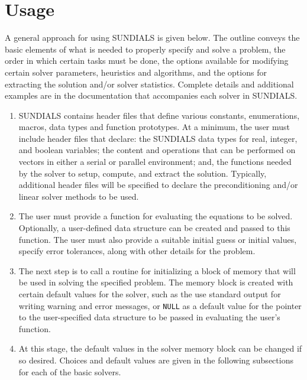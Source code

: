 \section{Usage}

A general approach for using SUNDIALS is given below. 
The outline conveys the basic elements of what is needed to properly
specify and solve a problem, the order in which certain tasks must be
done, the options available for modifying certain solver parameters,
heuristics and algorithms, and the options for extracting the solution
and/or solver statistics.
Complete details and additional examples are in the documentation that
accompanies each solver in SUNDIALS.

\begin{enumerate}

\item SUNDIALS contains header files that define various
constants, enumerations, macros, data types and function prototypes.
At a minimum, the user must include header files that declare: the
SUNDIALS data types for real, integer, and boolean variables; the
content and operations that can be performed on vectors in either a
serial or parallel environment; and, the functions needed
by the solver to setup, compute, and extract the solution. 
Typically, additional header files will be specified to declare the
preconditioning and/or linear solver methods to be used.

\item The user must provide a function for evaluating the equations to
be solved. Optionally, a user-defined data structure can be created
and passed to this function. The user must also provide a suitable
initial guess or initial values, specify error tolerances, along with
other details for the problem.

\item The next step is to call a routine for initializing a block of
memory that will be used in solving the specified problem. The memory
block is created with certain default values for the solver, such as
the use standard output for writing warning and error messages, or
{\tt NULL} as a default value for the pointer to the user-specified
data structure to be passed in evaluating the user's function.

\item At this stage, the default values in the solver memory block can
be changed if so desired. Choices and default values are given in the
following subsections for each of the basic solvers.


\end{enumerate}
